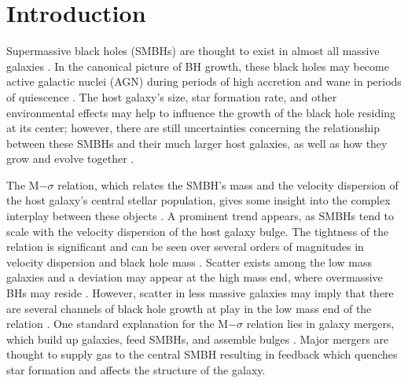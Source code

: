 \documentclass[manuscript]{aastex}
\begin{document}



\section{Introduction}\label{sec-intro}


Supermassive black holes (SMBHs) are thought to exist in almost all massive galaxies \citep{Kormendy2013}. In the canonical picture of BH growth, these black holes may become active galactic nuclei (AGN) during periods of high accretion and wane in periods of quiescence \citep{Alexander2005,Papovich2006,Volonteri2012}. The host galaxy's size, star formation rate, and other environmental effects may help to influence the growth of the black hole residing at its center; however, there are still uncertainties concerning the relationship between these SMBHs and their much larger host galaxies, as well as how they grow and evolve together \citep{Haehnelt2000,DiMatteo2005,Hopkins2006,Fu2008,Sijacki2009,Silverman2009,Mullaney2012}.

The M$-\sigma$ relation, which relates the SMBH's mass and the velocity dispersion of the host galaxy's central stellar population, gives some insight into the complex interplay between these objects \citep{Ferrarese2000}. A prominent trend appears, as SMBHs tend to scale with the velocity dispersion of the host galaxy bulge. The tightness of the relation is significant and can be seen over several orders of magnitudes in velocity dispersion and black hole mass \citep{Merritt2001,Graham2011,Mcconnell2013,Kormendy2013}. Scatter exists among the low mass galaxies and a deviation may appear at the high mass end, where overmassive BHs may reside \citep{VanDenBosch2007,Moster2010,Natarajan2011}. However, scatter in less massive galaxies may imply that there are several channels of black hole growth at play in the low mass end of the relation \citep{Micic2007,Volonteri2009,Reines2013,Graham2014}. One standard explanation for the M$-\sigma$ relation lies in galaxy mergers, which build up galaxies, feed SMBHs, and assemble bulges \citep{DiMatteo2005,Shen2008}. Major mergers are thought to supply gas to the central SMBH resulting in feedback which quenches star formation and affects the structure of the galaxy. 
\end{document}
